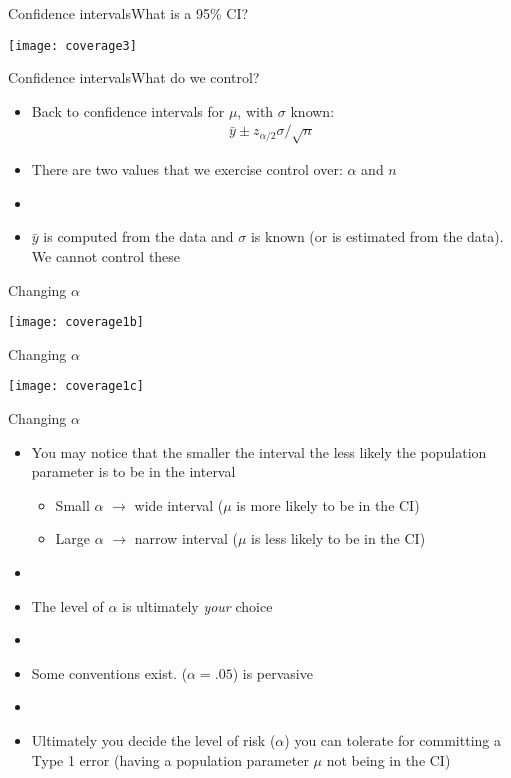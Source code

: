 \documentclass[xcolor=dvipsnames]{beamer}
\begin{document}
\begin{frame}{Confidence intervals}{What is a 95\% CI?}
\begin{center}
	\texttt{[image: coverage3]}
\end{center}
\end{frame}

\begin{frame}{Confidence intervals}{What do we control?}
\begin{itemize}
	\item Back to confidence intervals for $\mu$, with $\sigma$ known:
	\begin{gather*}
	\bar{y}\pm z_{\alpha/2} \sigma / \sqrt{n}
	\end{gather*}  \pause
	\item There are two values that we exercise control over: $\alpha$ and $n$  \pause
	\item[]
	\item $\bar{y}$ is computed from the data and $\sigma$ is known (or is estimated from the data). We cannot control these
\end{itemize}
\end{frame}

\begin{frame}{Changing $\alpha$}
	\begin{center}
			\texttt{[image: coverage1b]}
	\end{center}
\end{frame}

\begin{frame}{Changing $\alpha$}
\begin{center}
	\texttt{[image: coverage1c]}
\end{center}
\end{frame}

\begin{frame}{Changing $\alpha$}
\begin{itemize}
	\item You may notice that the smaller the interval the less likely the population parameter is to be in the interval  \pause
	\begin{itemize}
		\item Small $\alpha$ $\rightarrow$ wide interval ($\mu$ is more likely to be in the CI)  \pause
		\item Large $\alpha$ $\rightarrow$ narrow interval ($\mu$ is less likely to be in the CI)  \pause
	\end{itemize}
	\item[]
	\item The level of $\alpha$ is ultimately \emph{your} choice  \pause
	\item[]
	\item Some conventions exist. ($\alpha = .05$) is pervasive  \pause
	\item[]
	\item Ultimately you decide the level of risk ($\alpha$) you can tolerate for committing a Type 1 error (having a population parameter $\mu$ not being in the CI)
\end{itemize}
\end{frame}
\end{document}
